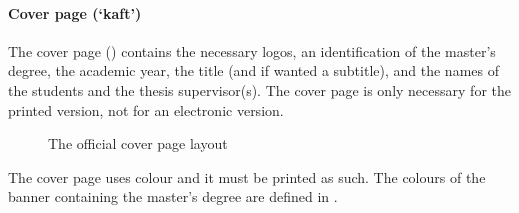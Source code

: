 \documentclass[11pt,article,oneside,a4paper]{memoir}
\newcommand\Dutch[1]{`\foreignlanguage{dutch}{#1}'}
\begin{document}
\paragraph{Cover page (\Dutch{kaft})} The cover page ()
contains the necessary logos, an identification of the master's degree, the
academic year, the title (and if wanted a subtitle), and the names of the
students and the thesis supervisor(s). The cover page is only necessary for
the printed version, not for an electronic version.
\begin{figure}
  \centering \fboxsep=0pt
  \caption{The official cover page layout}
  \label{fig:coverpage}
\end{figure}

The cover page uses colour and it must be printed as such. The colours of the
banner containing the master's degree are defined in .
\end{document}
